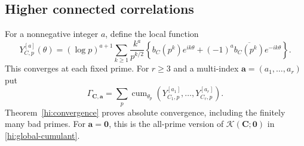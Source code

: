\documentclass[11pt,reqno]{amsart}
\numberwithin{equation}{section}
\theoremstyle{definition}
\theoremstyle{remark}
\begin{document}
\subsection{Higher connected correlations}
For a nonnegative integer $a$, define the local function
\begin{equation}Y_{C,p}^{[a]}(\theta)=(\log p)^{a+1}\sum_{k\ge1}\frac{k^a}{p^{k/2}}
\left\{b_C(p^k)e^{ik\theta}+(-1)^a\overline{b_C(p^k)}e^{-ik\theta}\right\}.\label{cor:jet-phase}\end{equation}
This converges at each fixed prime. For $r\ge3$ and a multi-index $\boldsymbol a=(a_1,\ldots,a_r)$ put
\begin{equation}\Gamma_{\boldsymbol C,\boldsymbol a}
=\sum_p\operatorname{cum}_{\theta_p}
  (Y_{C_1,p}^{[a_1]},\ldots,Y_{C_r,p}^{[a_r]}).\label{cor:Gamma}\end{equation}
Theorem~\ref{hi:convergence} proves absolute convergence, including the finitely many bad primes. For $\boldsymbol a=\boldsymbol0$, this is the all-prime version of $\mathcal K(\boldsymbol C;\boldsymbol0)$ in \eqref{hi:global-cumulant}.
\end{document}
